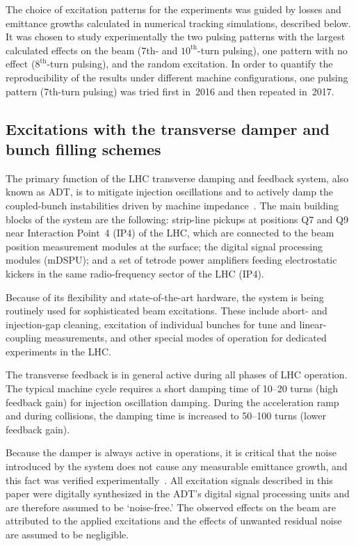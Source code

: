 \documentclass[%
 reprint,
 amsmath,amssymb,
 aps,
prstab,
longbibliography
]{revtex4-1}
\newcommand{\seventhtp}{7th-turn pulsing}
\begin{document}
The choice of excitation patterns for the experiments was guided by
losses and emittance growths calculated in numerical tracking
simulations, described below. It was chosen to study experimentally
the two pulsing patterns with the largest calculated effects on the
beam (7th- and $10^{\mathrm{th}}$-turn pulsing), one pattern with no
effect ($8^{\mathrm{th}}$-turn pulsing), and the random excitation. In
order to quantify the reproducibility of the results under different
machine configurations, one pulsing pattern (\seventhtp) was tried
first in~2016 and then repeated in~2017.


\subsection{Excitations with the transverse damper and bunch filling schemes}
\label{sec:adt}

The primary function of the LHC transverse damping and feedback
system, also known as ADT, is to mitigate injection oscillations and
to actively damp the coupled-bunch instabilities driven by machine
impedance~\cite{adt_sum_2008, adt_sum_2011}. The main building blocks
of the system are the following: strip-line pickups at positions Q7
and Q9 near Interaction Point~4 (IP4) of the LHC, which are connected
to the beam position measurement modules at the surface; the digital
signal processing modules (mDSPU); and a set of tetrode power
amplifiers feeding electrostatic kickers in the same radio-frequency
sector of the LHC (IP4).

Because of its flexibility and state-of-the-art hardware, the system
is being routinely used for sophisticated beam excitations. These
include abort- and injection-gap cleaning, excitation of individual
bunches for tune and linear-coupling measurements, and other special
modes of operation for dedicated experiments in the LHC.

The transverse feedback is in general active during all phases of LHC
operation. The typical machine cycle requires a short damping time of
10--20 turns (high feedback gain) for injection oscillation
damping. During the acceleration ramp and during collisions, the
damping time is increased to 50--100 turns (lower feedback gain).

Because the damper is always active in operations, it is critical that
the noise introduced by the system does not cause any measurable
emittance growth, and this fact was verified
experimentally~\cite{adt_noise_emit_2017}. All excitation signals
described in this paper were digitally synthesized in the ADT's
digital signal processing units and are therefore assumed to be
`noise-free.' The observed effects on the beam are attributed to the
applied excitations and the effects of unwanted residual noise are
assumed to be negligible.
\end{document}
